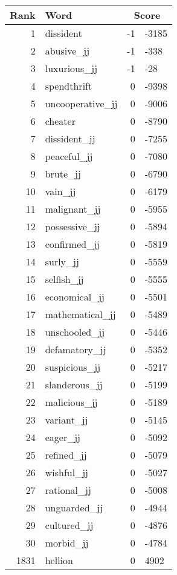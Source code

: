 \begin{longtable}[!htbp]{| rlr@{.}l |}
    \hline
    \textbf{Rank} & \textbf{Word} & \multicolumn{2}{c|}{\textbf{Score}} \\
    \hline
    \endhead
    1 & dissident & -1 & -3185 \\
    2 & abusive\_jj & -1 & -338 \\
    3 & luxurious\_jj & -1 & -28 \\
    4 & spendthrift & 0 & -9398 \\
    5 & uncooperative\_jj & 0 & -9006 \\
    6 & cheater & 0 & -8790 \\
    7 & dissident\_jj & 0 & -7255 \\
    8 & peaceful\_jj & 0 & -7080 \\
    9 & brute\_jj & 0 & -6790 \\
    10 & vain\_jj & 0 & -6179 \\
    11 & malignant\_jj & 0 & -5955 \\
    12 & possessive\_jj & 0 & -5894 \\
    13 & confirmed\_jj & 0 & -5819 \\
    14 & surly\_jj & 0 & -5559 \\
    15 & selfish\_jj & 0 & -5555 \\
    16 & economical\_jj & 0 & -5501 \\
    17 & mathematical\_jj & 0 & -5489 \\
    18 & unschooled\_jj & 0 & -5446 \\
    19 & defamatory\_jj & 0 & -5352 \\
    20 & suspicious\_jj & 0 & -5217 \\
    21 & slanderous\_jj & 0 & -5199 \\
    22 & malicious\_jj & 0 & -5189 \\
    23 & variant\_jj & 0 & -5145 \\
    24 & eager\_jj & 0 & -5092 \\
    25 & refined\_jj & 0 & -5079 \\
    26 & wishful\_jj & 0 & -5027 \\
    27 & rational\_jj & 0 & -5008 \\
    28 & unguarded\_jj & 0 & -4944 \\
    29 & cultured\_jj & 0 & -4876 \\
    30 & morbid\_jj & 0 & -4784 \\
    1831 & hellion & 0 & 4902 \\

\end{longtable}
